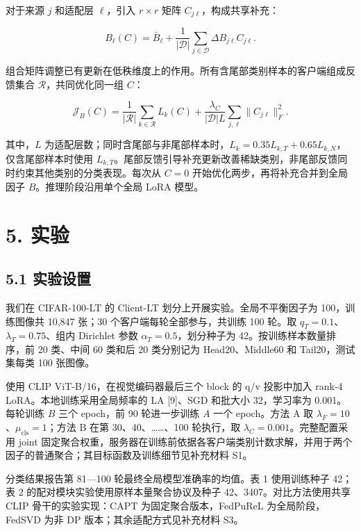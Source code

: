 \documentclass[10pt,twocolumn,letterpaper]{article}
\begin{document}
对于来源 $j$ 和适配层 $\ell$，引入 $r\times r$ 矩阵 $C_{j\ell}$，构成共享补充：


\begin{equation}B_\ell(C)=\bar B_\ell+\frac{1}{|\mathcal D|}
\sum_{j\in\mathcal D}\Delta B_{j\ell}C_{j\ell}.\end{equation}

组合矩阵调整已有更新在低秩维度上的作用。所有含尾部类别样本的客户端组成反馈集合 $\mathcal R$，共同优化同一组 $C$：


\begin{equation}\mathcal J_B(C)=\frac{1}{|\mathcal R|}\sum_{k\in\mathcal R}L_k(C)
+\frac{\lambda_C}{|\mathcal D|L}\sum_{j,\ell}\|C_{j\ell}\|_F^2.\end{equation}

其中，$L$ 为适配层数；同时含尾部与非尾部样本时，$L_k=0.35L_{k,T}+0.65L_{k,N}$，仅含尾部样本时使用 $L_{k,T}$。尾部反馈引导补充更新改善稀缺类别，非尾部反馈同时约束其他类别的分类表现。每次从 $C=0$ 开始优化两步，再将补充合并到全局因子 $B$。推理阶段沿用单个全局 LoRA 模型。


\section*{5. 实验}

\subsection*{5.1 实验设置}

我们在 CIFAR-100-LT 的 Client-LT 划分上开展实验。全局不平衡因子为 100，训练图像共 10,847 张；30 个客户端每轮全部参与，共训练 100 轮。取 $q_T=0.1$、$\lambda_T=0.75$、组内 Dirichlet 参数 $\alpha_T=0.5$，划分种子为 42。按训练样本数量排序，前 20 类、中间 60 类和后 20 类分别记为 Head20、Middle60 和 Tail20，测试集每类 100 张图像。


使用 CLIP ViT-B/16，在视觉编码器最后三个 block 的 q/v 投影中加入 rank-4 LoRA。本地训练采用全局频率的 LA [9]、SGD 和批大小 32，学习率为 0.001。每轮训练 $B$ 三个 epoch，前 90 轮进一步训练 $A$ 一个 epoch。方法 A 取 $\lambda_F=10$、$\mu_{\mathrm{cls}}=1$；方法 B 在第 30、40、……、100 轮执行，取 $\lambda_C=0.001$。完整配置采用 joint 固定聚合权重，服务器在训练前依据各客户端类别计数求解，并用于两个因子的普通聚合；其目标函数及训练细节见补充材料 S1。


分类结果报告第 81—100 轮最终全局模型准确率的均值。表 1 使用训练种子 42；表 2 的配对模块实验使用原样本量聚合协议及种子 42、3407。对比方法使用共享 CLIP 骨干的实验实现：CAPT 为固定聚合版本，FedPuReL 为全局阶段，FedSVD 为非 DP 版本；其余适配方式见补充材料 S3。
\end{document}
